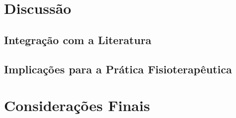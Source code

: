 \documentclass[openright]{tex/estilos/normas-utf-tex}
\begin{document}
\chapter{Discussão}
\label{chap:discussao}


\section{Integração com a Literatura}
\label{sec:integracao-literatura}


\section{Implicações para a Prática Fisioterapêutica}
\label{sec:implicacoes-pratica}


\chapter{Considerações Finais}
\label{chap:consideracoes-finais}


\clearpage %
\label{bibstart}


\label{bibend}
\end{document}
